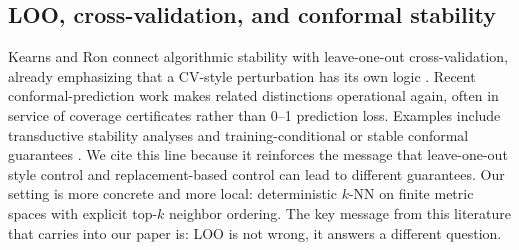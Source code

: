 \subsection{LOO, cross-validation, and conformal stability}

Kearns and Ron connect algorithmic stability with leave-one-out
cross-validation, already emphasizing that a CV-style perturbation has its own
logic \cite{kearns1999algorithmic}.  Recent conformal-prediction work makes
related distinctions operational again, often in service of coverage
certificates rather than 0--1 prediction loss.  Examples include transductive
stability analyses and training-conditional or stable conformal guarantees
\cite{liang2023algorithmic,pournaderi2024training}.  We cite this line because it
reinforces the message that leave-one-out style control and replacement-based
control can lead to different guarantees.  Our setting is more concrete and
more local: deterministic $k$-NN on finite metric spaces with explicit top-$k$
neighbor ordering.  The key message from this literature that carries into our
paper is: LOO is not wrong, it answers a different question.

